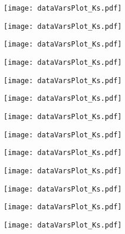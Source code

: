 \begin{figure}[H]
\ContinuedFloat
\begin{subfigure}{0.5\linewidth}
	\texttt{[image: dataVarsPlot\_Ks.pdf]}
\end{subfigure}
\begin{subfigure}{0.5\linewidth}
	\texttt{[image: dataVarsPlot\_Ks.pdf]}
\end{subfigure}
\begin{subfigure}{0.5\linewidth}
\texttt{[image: dataVarsPlot\_Ks.pdf]}
\end{subfigure}
\begin{subfigure}{0.5\linewidth}
\texttt{[image: dataVarsPlot\_Ks.pdf]}
\end{subfigure}
\end{figure}

\begin{figure}[H]
	\ContinuedFloat
	\begin{subfigure}{0.5\linewidth}
		\texttt{[image: dataVarsPlot\_Ks.pdf]}
	\end{subfigure}
	\begin{subfigure}{0.5\linewidth}
		\texttt{[image: dataVarsPlot\_Ks.pdf]}
	\end{subfigure}
\begin{subfigure}{0.5\linewidth}
\texttt{[image: dataVarsPlot\_Ks.pdf]}
\end{subfigure}
\begin{subfigure}{0.5\linewidth}
\texttt{[image: dataVarsPlot\_Ks.pdf]}
\end{subfigure}

\end{figure}

\begin{figure}[H]
	\ContinuedFloat
\begin{subfigure}{0.5\linewidth}
	\texttt{[image: dataVarsPlot\_Ks.pdf]}
\end{subfigure}
\begin{subfigure}{0.5\linewidth}
	\texttt{[image: dataVarsPlot\_Ks.pdf]}
\end{subfigure}
\begin{subfigure}{0.5\linewidth}
	\texttt{[image: dataVarsPlot\_Ks.pdf]}
\end{subfigure}
\begin{subfigure}{0.5\linewidth}
	\texttt{[image: dataVarsPlot\_Ks.pdf]}
\end{subfigure}
\end{figure}

\begin{figure}[H]
	\ContinuedFloat
	\begin{subfigure}{0.5\linewidth}
		\texttt{[image: dataVarsPlot\_Ks.pdf]}
	\end{subfigure}
\end{figure}


